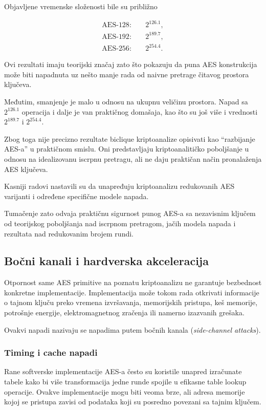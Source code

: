 Objavljene vremenske složenosti bile su približno

\begin{align}
\mathrm{AES\mbox{-}128}:&\quad 2^{126.1},\\
\mathrm{AES\mbox{-}192}:&\quad 2^{189.7},\\
\mathrm{AES\mbox{-}256}:&\quad 2^{254.4}.
\end{align}

Ovi rezultati imaju teorijski značaj zato što pokazuju da puna AES
konstrukcija može biti napadnuta uz nešto manje rada od naivne pretrage
čitavog prostora ključeva.

Međutim, smanjenje je malo u odnosu na ukupnu veličinu prostora.
Napad sa $2^{126.1}$ operacija i dalje je van praktičnog domašaja, kao
što su još više i vrednosti $2^{189.7}$ i $2^{254.4}$.

Zbog toga nije precizno rezultate biclique kriptoanalize opisivati kao
``razbijanje AES-a'' u praktičnom smislu. Oni predstavljaju
kriptoanalitičko poboljšanje u odnosu na idealizovanu iscrpnu pretragu,
ali ne daju praktičan način pronalaženja AES ključeva.

Kasniji radovi nastavili su da unapređuju kriptoanalizu redukovanih
AES varijanti i određene specifične modele napada.

Tumačenje zato odvaja praktičnu sigurnost punog AES-a sa nezavisnim
ključem od teorijskog poboljšanja nad iscrpnom pretragom, jačih modela
napada i rezultata nad redukovanim brojem rundi.

\subsection{Bočni kanali i hardverska akceleracija}
\label{subsec:aes_sidechannels}

Otpornost same AES primitive na poznatu kriptoanalizu ne garantuje
bezbednost konkretne implementacije. Implementacija može tokom rada
otkrivati informacije o tajnom ključu preko vremena izvršavanja,
memorijskih pristupa, keš memorije, potrošnje energije,
elektromagnetnog zračenja ili namerno izazvanih grešaka.

Ovakvi napadi nazivaju se napadima putem bočnih kanala
(\emph{side-channel attacks}).


\subsubsection{Timing i cache napadi}

Rane softverske implementacije AES-a često su koristile unapred
izračunate tabele kako bi više transformacija jedne runde spojile u
efikasne table lookup operacije. Ovakve implementacije mogu biti veoma
brze, ali adresa memorije kojoj se pristupa zavisi od podataka koji su
posredno povezani sa tajnim ključem.

